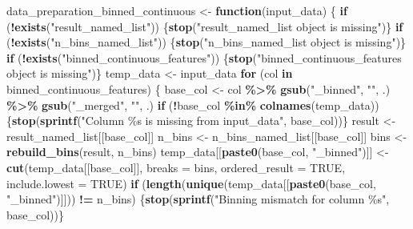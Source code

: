 \documentclass[
  english,
  11pt,
]{article}
\newenvironment{Shaded}{\begin{snugshade}}{\end{snugshade}}
\newcommand{\AttributeTok}[1]{\textcolor[rgb]{0.13,0.29,0.53}{#1}}
\newcommand{\ConstantTok}[1]{\textcolor[rgb]{0.56,0.35,0.01}{#1}}
\newcommand{\ControlFlowTok}[1]{\textcolor[rgb]{0.13,0.29,0.53}{\textbf{#1}}}
\newcommand{\FunctionTok}[1]{\textcolor[rgb]{0.13,0.29,0.53}{\textbf{#1}}}
\newcommand{\NormalTok}[1]{#1}
\newcommand{\OtherTok}[1]{\textcolor[rgb]{0.56,0.35,0.01}{#1}}
\newcommand{\SpecialCharTok}[1]{\textcolor[rgb]{0.81,0.36,0.00}{\textbf{#1}}}
\newcommand{\StringTok}[1]{\textcolor[rgb]{0.31,0.60,0.02}{#1}}
\begin{document}
\begin{Shaded}
\begin{Highlighting}[]
\NormalTok{data\_preparation\_binned\_continuous }\OtherTok{\textless{}{-}} \ControlFlowTok{function}\NormalTok{(input\_data) \{}
    \ControlFlowTok{if}\NormalTok{ (}\SpecialCharTok{!}\FunctionTok{exists}\NormalTok{(}\StringTok{"result\_named\_list"}\NormalTok{)) \{}\FunctionTok{stop}\NormalTok{(}\StringTok{"result\_named\_list object is missing"}\NormalTok{)\}}
    \ControlFlowTok{if}\NormalTok{ (}\SpecialCharTok{!}\FunctionTok{exists}\NormalTok{(}\StringTok{"n\_bins\_named\_list"}\NormalTok{)) \{}\FunctionTok{stop}\NormalTok{(}\StringTok{"n\_bins\_named\_list object is missing"}\NormalTok{)\}}
    \ControlFlowTok{if}\NormalTok{ (}\SpecialCharTok{!}\FunctionTok{exists}\NormalTok{(}\StringTok{"binned\_continuous\_features"}\NormalTok{)) \{}\FunctionTok{stop}\NormalTok{(}\StringTok{"binned\_continuous\_features object is missing"}\NormalTok{)\}}
\NormalTok{    temp\_data }\OtherTok{\textless{}{-}}\NormalTok{ input\_data}
    \ControlFlowTok{for}\NormalTok{ (col }\ControlFlowTok{in}\NormalTok{ binned\_continuous\_features) \{}
\NormalTok{        base\_col }\OtherTok{\textless{}{-}}\NormalTok{ col }\SpecialCharTok{\%\textgreater{}\%} \FunctionTok{gsub}\NormalTok{(}\StringTok{"\_binned"}\NormalTok{, }\StringTok{""}\NormalTok{, .) }\SpecialCharTok{\%\textgreater{}\%} \FunctionTok{gsub}\NormalTok{(}\StringTok{"\_merged"}\NormalTok{, }\StringTok{""}\NormalTok{, .)}
        \ControlFlowTok{if}\NormalTok{ (}\SpecialCharTok{!}\NormalTok{base\_col }\SpecialCharTok{\%in\%} \FunctionTok{colnames}\NormalTok{(temp\_data)) \{}\FunctionTok{stop}\NormalTok{(}\FunctionTok{sprintf}\NormalTok{(}\StringTok{"Column \%s is missing from input\_data"}\NormalTok{, base\_col))\}}
\NormalTok{        result }\OtherTok{\textless{}{-}}\NormalTok{ result\_named\_list[[base\_col]]}
\NormalTok{        n\_bins }\OtherTok{\textless{}{-}}\NormalTok{ n\_bins\_named\_list[[base\_col]]}
\NormalTok{        bins }\OtherTok{\textless{}{-}} \FunctionTok{rebuild\_bins}\NormalTok{(result, n\_bins)}
\NormalTok{        temp\_data[[}\FunctionTok{paste0}\NormalTok{(base\_col, }\StringTok{"\_binned"}\NormalTok{)]] }\OtherTok{\textless{}{-}} \FunctionTok{cut}\NormalTok{(temp\_data[[base\_col]], }\AttributeTok{breaks =}\NormalTok{ bins, }\AttributeTok{ordered\_result =} \ConstantTok{TRUE}\NormalTok{, }\AttributeTok{include.lowest =} \ConstantTok{TRUE}\NormalTok{)}
        \ControlFlowTok{if}\NormalTok{ (}\FunctionTok{length}\NormalTok{(}\FunctionTok{unique}\NormalTok{(temp\_data[[}\FunctionTok{paste0}\NormalTok{(base\_col, }\StringTok{"\_binned"}\NormalTok{)]])) }\SpecialCharTok{!=}\NormalTok{ n\_bins) \{}\FunctionTok{stop}\NormalTok{(}\FunctionTok{sprintf}\NormalTok{(}\StringTok{"Binning mismatch for column \%s"}\NormalTok{, base\_col))\}}

\end{Highlighting}
\end{Shaded}
\end{document}
